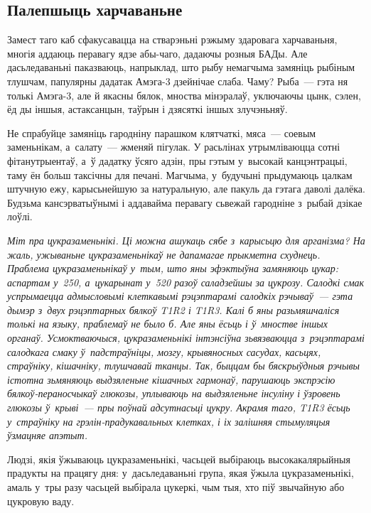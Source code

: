 \subsection*{Палепшыць харчаваньне}

Замест таго каб сфакусавацца на стварэньні рэжыму здаровага харчаваньня, многія аддаюць перавагу ядзе абы-чаго, дадаючы розныя БАДы. Але дасьледаваньні паказваюць, напрыклад, што рыбу немагчыма замяніць рыбіным тлушчам, папулярны дадатак Амэга-3 дзейнічае слаба. Чаму? Рыба~--- гэта ня толькі Амэга-3, але й якасны бялок, мноства мінэралаў, уключаючы цынк, сэлен, ёд ды іншыя, астаксанцын, таўрын і дзясяткі іншых злучэньняў.

Не спрабуйце замяніць гародніну парашком клятчаткі, мяса~--- соевым заменьнікам, а~салату~--- жменяй пігулак. У расьлінах утрымліваюцца сотні фітанутрыентаў, а~ў дадатку ўсяго адзін, пры гэтым у~высокай канцэнтрацыі, таму ён больш таксічны для печані. Магчыма, у~будучыні прыдумаюць цалкам штучную ежу, карысьнейшую за натуральную, але пакуль да гэтага даволі далёка. Будзьма кансэрватыўнымі і аддавайма перавагу сьвежай гародніне з~рыбай дзікае лоўлі.

\emph{Міт пра цукразаменьнікі. Ці можна ашукаць сябе з~карысьцю для арганізма? На жаль, ужываньне цукразаменьнікаў не дапамагае прыкметна схуднець. Праблема цукразаменьнікаў у~тым, што яны эфэктыўна замяняюць цукар: аспартам у~250, а~цукарынат у~520 разоў саладзейшы за цукрозу. Салодкі смак успрымаецца адмысловымі клеткавымі рэцэптарамі салодкіх рэчываў~--- гэта дымэр з~двух рэцэптарных бялкоў T1R2 і T1R3. Калі б яны разьмяшчаліся толькі на языку, праблемаў не было б. Але яны ёсьць і ў~мностве іншых органаў. Усмоктваючыся, цукразаменьнікі інтэнсіўна зьвязваюцца з~рэцэптарамі салодкага смаку ў~падстраўніцы, мозгу, крывяносных сасудах, касьцях, страўніку, кішачніку, тлушчавай тканцы. Так, быццам бы бяскрыўдныя рэчывы істотна зьмяняюць выдзяленьне кішачных гармонаў, парушаюць экспрэсію бялкоў-пераносчыкаў глюкозы, уплываюць на выдзяленьне інсуліну і ўзровень глюкозы ў~крыві~--- пры поўнай адсутнасьці цукру. Акрамя таго, T1R3 ёсьць у~страўніку на грэлін-прадукавальных клетках, і іх залішняя стымуляцыя ўзмацняе апэтыт.}


Людзі, якія ўжываюць цукразаменьнікі, часьцей выбіраюць высокакалярыйныя прадукты на працягу дня: у~дасьледаваньні група, якая ўжыла цукразаменьнікі, амаль у~тры разу часьцей выбірала цукеркі, чым тыя, хто піў звычайную або цукровую ваду.

